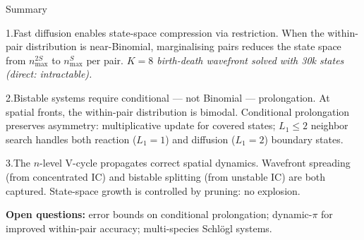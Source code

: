 \documentclass[10pt,aspectratio=169]{beamer}
\begin{document}
\begin{frame}{Summary}

  \begin{block}{1.\quad Fast diffusion enables state-space compression via restriction.}
    When the within-pair distribution is near-Binomial, marginalising pairs reduces
    the state space from $n_{\max}^{2S}$ to $n_{\max}^{S}$ per pair.
    \emph{$K{=}8$ birth-death wavefront solved with 30k states (direct: intractable).}
  \end{block}

  \smallskip
  \begin{block}{2.\quad Bistable systems require conditional --- not Binomial --- prolongation.}
    At spatial fronts, the within-pair distribution is bimodal.
    Conditional prolongation preserves asymmetry: multiplicative update for covered states;
    $L_1{\leq}2$ neighbor search handles both reaction ($L_1{=}1$) and
    diffusion ($L_1{=}2$) boundary states.
  \end{block}

  \smallskip
  \begin{block}{3.\quad The $n$-level V-cycle propagates correct spatial dynamics.}
    Wavefront spreading (from concentrated IC) and bistable splitting (from unstable IC)
    are both captured.
    State-space growth is controlled by pruning: no explosion.
  \end{block}

  \smallskip
  \textbf{Open questions:} error bounds on conditional prolongation;
  dynamic-$\pi$ for improved within-pair accuracy; multi-species Schl\"{o}gl systems.

\end{frame}

\appendix
\end{document}
